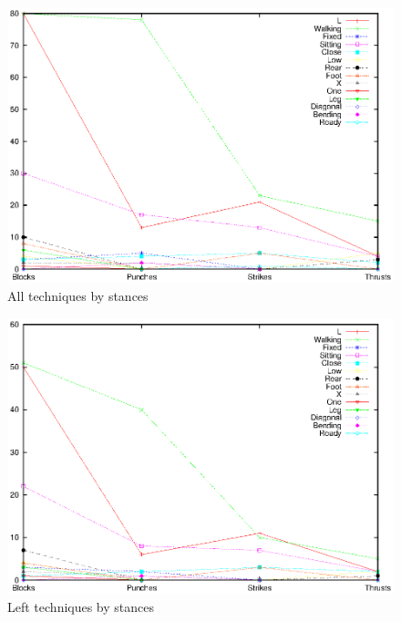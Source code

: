 \documentclass[10pt,twocolumn,a4paper]{article}
\begin{document}
  \begin{figure}
    \includegraphics[scale=0.72]{data/gnuplot/eps/stances_all}
    \caption{All techniques by stances}
    \label{fig:stances_all}
  \end{figure}

  \begin{figure}
    \includegraphics[scale=0.72]{data/gnuplot/eps/stances_left}
    \caption{Left techniques by stances}
    \label{fig:stances_left}
  \end{figure}
\end{document}
